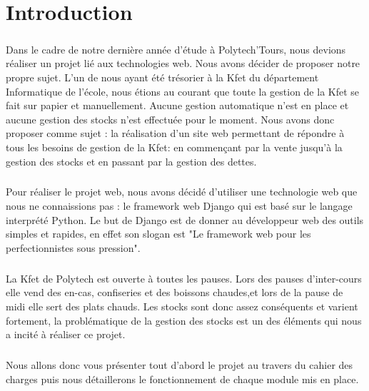 \documentclass[twoside,UTF8]{EPURapport}
\begin{document}
\renewcommand{\labelitemi}{\textbullet}

\chapter{Introduction}%

    \paragraph{}Dans le cadre de notre dernière année d'étude à Polytech'Tours, nous devions réaliser un projet lié aux technologies web. Nous avons décider de proposer notre propre sujet. L'un de nous ayant été trésorier à la Kfet du département Informatique de l'école, nous étions au courant que toute la gestion de la Kfet se fait sur papier et manuellement. Aucune gestion automatique n'est en place et aucune gestion des stocks n'est effectuée pour le moment. Nous avons donc proposer comme sujet : la réalisation d'un site web permettant de répondre à tous les besoins de gestion de la Kfet: en commençant par la vente jusqu'à la gestion des stocks et en passant par la gestion des dettes.

    \paragraph{}Pour réaliser le projet web, nous avons décidé d'utiliser une technologie web que nous ne connaissions
pas : le  framework web Django qui est basé sur le langage interprété Python. Le but de Django est de donner au
développeur web des outils simples et rapides, en effet son slogan est "Le framework web pour les perfectionnistes sous
pression".

    \paragraph{}La Kfet de Polytech est ouverte à toutes les pauses. Lors des pauses d'inter-cours elle vend des en-cas, confiseries et des boissons chaudes,et lors de la pause de midi elle sert des plats chauds. Les stocks sont donc assez conséquents et varient fortement, la problématique de la gestion des stocks est un des éléments qui nous a incité à réaliser ce projet.

    \paragraph{}Nous allons donc vous présenter tout d'abord le projet au travers du cahier des charges puis nous détaillerons le fonctionnement de chaque module mis en place.
\end{document}
